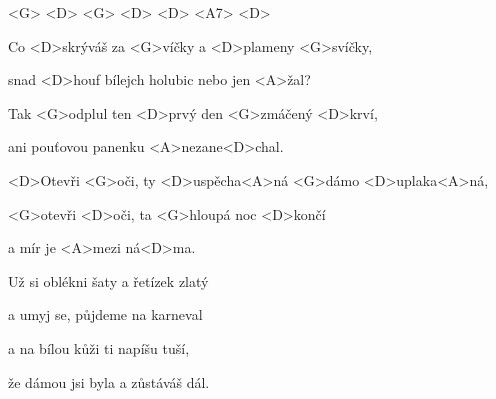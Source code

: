

<G> <D> <G> <D> <D> <A7> <D>

\zs
Co <D>skrýváš za <G>víčky a <D>plameny <G>svíčky,

snad <D>houf bílejch holubic nebo jen <A>žal?

Tak <G>odplul ten <D>prvý den <G>zmáčený <D>krví,

ani pouťovou panenku <A>nezane<D>chal.
\ks

\zr
<D>Otevři <G>oči, ty <D>uspěcha<A>ná <G>dámo <D>uplaka<A>ná,

<G>otevři <D>oči, ta <G>hloupá noc <D>končí

a mír je <A>mezi ná<D>ma.
\kr

\zs
Už si oblékni šaty a řetízek zlatý

a umyj se, půjdeme na karneval

a na bílou kůži ti napíšu tuší,

že dámou jsi byla a zůstáváš dál.
\ks

\zr \kr

\kp
